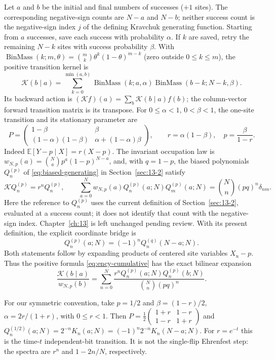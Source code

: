 Let $a$ and $b$ be the initial and final numbers of successes ($+1$ sites).
The corresponding negative-sign counts are $N-a$ and $N-b$; neither
success count is the negative-sign index $j$ of the defining Kravchuk
generating function. Starting from $a$ successes, save each success with
probability $\alpha$. If $k$ are saved, retry the remaining $N-k$ sites
with success probability $\beta$. With
$\operatorname{BinMass}(k;m,\theta)=\binom mk\theta^k(1-\theta)^{m-k}$ (zero outside $0\le k\le m$), the
positive transition kernel is
\begin{equation}\label{eq:ency-cumulative}
\mathcal K(b\mid a)=\sum_{k=0}^{\min(a,b)}
\operatorname{BinMass}(k;a,\alpha)\operatorname{BinMass}(b-k;N-k,\beta).
\end{equation}
Its backward action is $(\mathcal Kf)(a)=\sum_b\mathcal K(b\mid a)f(b)$;
the column-vector forward transition matrix is its transpose.
For $0\le\alpha<1$, $0<\beta<1$, the one-site transition and its
stationary parameter are
\[
P=\begin{pmatrix}1-\beta&\beta\\
(1-\alpha)(1-\beta)&\alpha+(1-\alpha)\beta\end{pmatrix},\qquad
r=\alpha(1-\beta),\quad p=\frac{\beta}{1-r}.
\]
Indeed $\mathbb E[Y-p\mid X]=r(X-p)$. The invariant occupation law is
$w_{N,p}(a)=\binom Na p^a(1-p)^{N-a}$, and, with $q=1-p$, the biased polynomials
$Q_n^{(p)}$ of \eqref{eq:biased-generating} in Section~\ref{sec:13-2}
satisfy
\[
\mathcal KQ_n^{(p)}=r^nQ_n^{(p)},\qquad
\sum_{a=0}^N w_{N,p}(a)Q_n^{(p)}(a;N)Q_m^{(p)}(a;N)=\binom Nn(pq)^n\delta_{nm}.
\]
Here the reference to $Q_n^{(p)}$ uses the current definition of
Section~\ref{sec:13-2}, evaluated at a success count; it does not identify
that count with the negative-sign index. Chapter~\ref{ch:13} is left
unchanged pending review. With its present definition, the explicit
coordinate bridge is
\[
Q_n^{(p)}(a;N)=(-1)^nQ_n^{(q)}(N-a;N).
\]
Both statements follow by expanding products of centered site variables
$X_u-p$. Thus the positive formula \eqref{eq:ency-cumulative} has the
exact bilinear expansion
\begin{equation}\label{eq:ency-cumulative-spectral}
\frac{\mathcal K(b\mid a)}{w_{N,p}(b)}
=\sum_{n=0}^N\frac{r^nQ_n^{(p)}(a;N)Q_n^{(p)}(b;N)}{\binom Nn(pq)^n}.
\end{equation}

For our symmetric convention, take $p=1/2$ and
$\beta=(1-r)/2$, $\alpha=2r/(1+r)$, with $0\le r<1$.
Then $P=\frac12\left(\begin{smallmatrix}1+r&1-r\\1-r&1+r\end{smallmatrix}\right)$
and $Q_n^{(1/2)}(a;N)=2^{-n}K_n(a;N)=(-1)^n2^{-n}K_n(N-a;N)$. For $r=e^{-t}$ this is the time-$t$ independent-bit
transition. It is not the single-flip Ehrenfest step: the spectra are
$r^n$ and $1-2n/N$, respectively.

